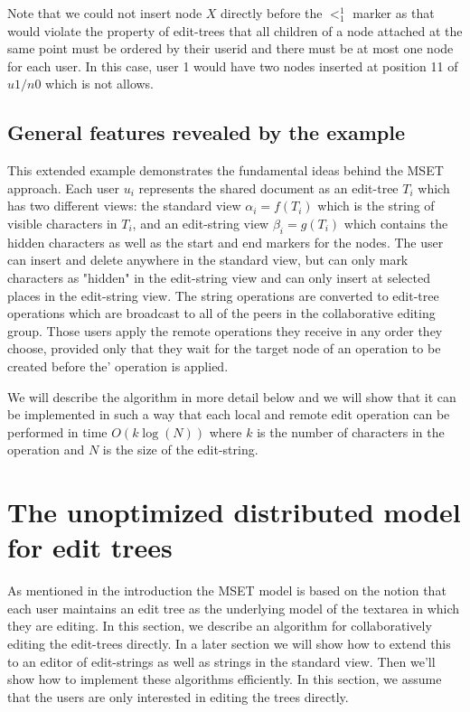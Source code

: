 \documentclass{amsart}
\begin{document}
Note that we could not insert node $X$ directly before the $<^1_1$ marker
as that would violate the property of edit-trees that all children of a
node attached at the same point must be ordered by their userid and there
must be at most one node for each user. In this case, user 1 would have two
nodes inserted at position 11 of $u1/n0$ which is not allows.

\subsection{General features revealed by the example}
This extended example demonstrates the fundamental ideas behind the MSET
approach. Each user $u_i$ represents the shared document as an edit-tree $T_i$
which has two different views: the standard view $\alpha_i = f(T_i)$ which
is the string of visible characters in $T_i$, and an edit-string view
$\beta_i = g(T_i)$ which contains the hidden characters as well as the
start and end markers for the nodes. The user can insert and delete anywhere
in the standard view, but can only mark characters as "hidden" in the
edit-string view and can only insert at selected places in the edit-string
view. The string operations are converted to edit-tree operations which are
broadcast to all of the peers in the collaborative editing group. Those users
apply the remote operations they receive in any order they choose, provided only
that they wait for the target node of an operation to be created before the'
operation is applied.

We will describe the algorithm in more detail below and we will show that it
can be implemented in such a way that each local and remote edit operation
can be performed in time $O(k\log(N))$ where $k$ is the number of characters
in the operation and $N$ is the size of the edit-string.



\section{The unoptimized distributed model for edit trees}

As mentioned in the introduction the MSET model is based on the notion that 
each user maintains an edit tree as the underlying model of the textarea in
which they are editing. In this section, we describe an algorithm for 
collaboratively editing the edit-trees directly. In a later section we will show
how to extend this to an editor of edit-strings as well as strings in
the standard view. Then we'll show how to implement these algorithms
efficiently. In this section, we assume that the users are only interested in editing
the trees directly.
\end{document}
